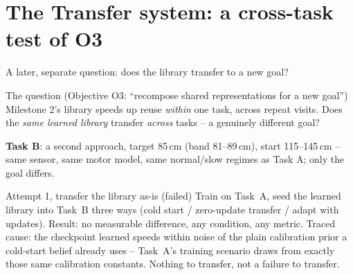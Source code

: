 \documentclass[11pt,aspectratio=169]{beamer}
\begin{document}
\section{The Transfer system: a cross-task test of O3}

\begin{frame}{A later, separate question: does the library transfer to a new goal?}
\begin{block}{The question (Objective O3: ``recompose shared representations for a new goal'')}
Milestone 2's library speeds up reuse \emph{within} one task, across repeat visits. Does the \emph{same learned library} transfer \emph{across} tasks -- a genuinely different goal?
\end{block}
\textbf{Task B}: a second approach, target 85\,cm (band 81--89\,cm), start 115--145\,cm -- same sensor, same motor model, same normal/slow regimes as Task A; only the goal differs.
\begin{block}{Attempt 1, transfer the library as-is (failed)}
Train on Task~A, seed the learned library into Task~B three ways (cold start / zero-update transfer / adapt with updates). Result: \alert{no measurable difference, any condition, any metric}. Traced cause: the checkpoint learned speeds within noise of the plain calibration prior a cold-start belief already uses -- Task~A's training scenario draws from exactly those same calibration constants. Nothing to transfer, not a failure to transfer.
\end{block}
\end{frame}
\end{document}
